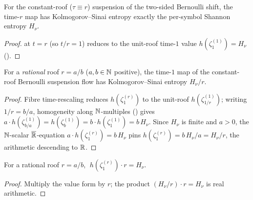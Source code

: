 \begin{theorem}\label{thm:susp-timeRBern}
  \leanok
  For the constant-roof ($\tau \equiv r$) suspension of the two-sided Bernoulli shift, the time-$r$
  map has Kolmogorov--Sinai entropy exactly the per-symbol Shannon entropy $H_\nu$.
\end{theorem}
\begin{proof}\leanok
   at $t = r$ (so $t/r = 1$) reduces to the unit-roof time-$1$ value
  $h(\zeta^{(1)}_1) = H_\nu$ ().
\end{proof}

\begin{theorem}\label{thm:susp-timeOneEntropy}
  \leanok
  For a \emph{rational} roof $r = a/b$ ($a, b \in \mathbb{N}$ positive), the time-$1$ map of the
  constant-roof Bernoulli suspension flow has Kolmogorov--Sinai entropy $H_\nu/r$.
\end{theorem}
\begin{proof}\leanok
  Fibre time-rescaling reduces $h(\zeta^{(r)}_1)$ to the unit-roof $h(\zeta^{(1)}_{1/r})$; writing
  $1/r = b/a$, homogeneity along $\mathbb{N}$-multiples () gives
  $a \cdot h(\zeta^{(1)}_{b/a}) = h(\zeta^{(1)}_b) = b \cdot h(\zeta^{(1)}_1) = b\,H_\nu$. Since
  $H_\nu$ is finite and $a > 0$, the $\mathbb{N}$-scalar $\overline{\mathbb{R}}$-equation $a \cdot h(\zeta^{(r)}_1)
  = b\,H_\nu$ pins $h(\zeta^{(r)}_1) = b\,H_\nu/a = H_\nu/r$, the arithmetic descending to $\mathbb{R}$.
\end{proof}

\begin{theorem}\label{thm:susp-timeOneEntropyMul}
  \leanok
  For a rational roof $r = a/b$, $\;h(\zeta^{(r)}_1) \cdot r = H_\nu$.
\end{theorem}
\begin{proof}\leanok
  Multiply the value form  by $r$; the product
  $(H_\nu/r) \cdot r = H_\nu$ is real arithmetic.
\end{proof}

